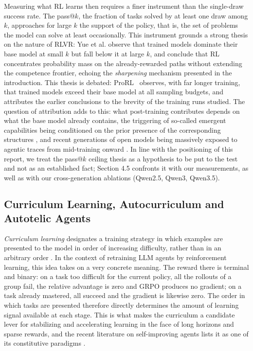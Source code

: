 \documentclass[11pt,a4paper]{article}
\begin{document}
Measuring what RL learns then requires a finer instrument than the single-draw success rate. The pass@$k$, the fraction of tasks solved by at least one draw among $k$, approaches for large $k$ the support of the policy, that is, the set of problems the model can solve at least occasionally. This instrument grounds a strong thesis on the nature of RLVR: Yue et al. \cite{yue2025rlvr} observe that trained models dominate their base model at small $k$ but fall below it at large $k$, and conclude that RL concentrates probability mass on the already-rewarded paths without extending the competence frontier, echoing the \emph{sharpening} mechanism \cite{huang2024self} presented in the introduction. This thesis is debated: ProRL~\cite{liu2025prorl} observes, with far longer training, that trained models exceed their base model at all sampling budgets, and attributes the earlier conclusions to the brevity of the training runs studied.
 The question of attribution adds to this: what post-training contributes depends on what the base model already contains, the triggering of so-called emergent capabilities being conditioned on the prior presence of the corresponding structures \cite{liu2025drgrpo}, and recent generations of open models being massively exposed to agentic traces from mid-training onward \cite{qwen3coder2025, kimik2_2025}. In line with the positioning of this report, we treat the pass@$k$ ceiling thesis as a hypothesis to be put to the test and not as an established fact; Section 4.5 confronts it with our measurements, as well as with our cross-generation ablations (Qwen2.5, Qwen3, Qwen3.5).

\subsection{Curriculum Learning, Autocurriculum and Autotelic Agents}


\emph{Curriculum learning} designates a training strategy in which examples are presented to the model in order of increasing difficulty, rather than in an arbitrary order \cite{bengio2009curriculum}. In the context of retraining LLM agents by reinforcement learning, this idea takes on a very concrete meaning. The reward there is terminal and binary: on a task too difficult for the current policy, all the rollouts of a group fail, the relative advantage is zero and GRPO produces no gradient; on a task already mastered, all succeed and the gradient is likewise zero. The order in which tasks are presented therefore directly determines the amount of learning signal available at each stage. This is what makes the curriculum a candidate lever for stabilizing and accelerating learning in the face of long horizons and sparse rewards, and the recent literature on self-improving agents lists it as one of its constitutive paradigms \cite{gao2025selfevolving}.
\end{document}
